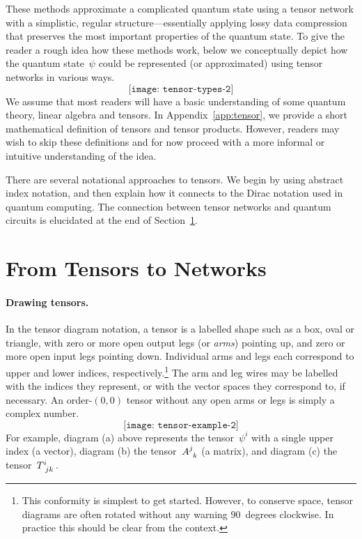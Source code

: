 \documentclass[aps,pra,12pt,nofootinbib,superscriptaddress,longbibliography]{revtex4-1}
\newcommand{\add}[1]{\textcolor{dred}{*#1*}}
\theoremstyle{plain}
\theoremstyle{definition}
\newcommand{\be}{\begin{equation}}
\newcommand{\ee}{\end{equation}}
\begin{document}
These methods approximate a complicated quantum state using a tensor network with a simplistic, regular structure---essentially applying lossy data compression that preserves the most important properties of the quantum state.
To give the reader a rough idea how these methods work, below we conceptually depict how the quantum state~$\psi$
could be represented (or approximated) using tensor networks in various ways.
\be
 \texttt{[image: tensor-types-2]}
\ee
We assume that most readers will have a basic understanding of some quantum theory, linear algebra and tensors.
In Appendix~\ref{app:tensor}, we provide a short mathematical definition of tensors and tensor products.
However, readers may wish to skip these definitions and for now proceed with a more informal or intuitive
understanding of the idea.

There are several notational approaches to tensors.
We begin by using abstract index notation, and then explain how it connects to the Dirac notation used in quantum computing.
The connection between tensor networks and quantum circuits is elucidated at the end of Section~\ref{sec:penrose}. %


\tableofcontents


\section[Tensors to Networks]{From Tensors to Networks} \label{sec:penrose}



\paragraph{{\bf Drawing tensors.}}
In the tensor diagram notation,
a tensor is a labelled shape such as a box, oval or triangle,
with zero or more open output legs (or \emph{arms}) pointing up, and zero or more
open input legs pointing down.
Individual arms and legs each correspond to upper and lower indices, respectively.\footnote{
This conformity is simplest to get started.
However, to conserve space, tensor diagrams are often rotated without
any warning $90$~degrees clockwise. In practice this should
be clear from the context.}
The arm and leg wires may be labelled with the indices they represent,
or with the vector spaces they correspond to, if necessary.
An order-$(0,0)$ tensor without any open arms or legs is
simply a complex number.
\be
 \texttt{[image: tensor-example-2]} 
\ee
For example, diagram (a) above represents the tensor~$\psi^i$ with a
single upper index (a vector),
diagram (b) the tensor~$A\indices{^{j}_{k}}$ (a matrix),
and diagram (c) the tensor~$T\indices{^i_{jk}}$.
\end{document}
